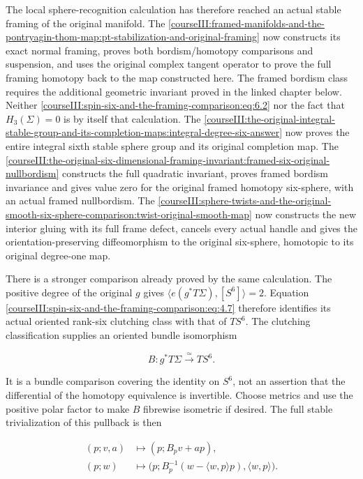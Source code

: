 The local sphere-recognition calculation has therefore reached an actual stable framing of the original manifold. The \cref{courseIII:framed-manifolds-and-the-pontryagin-thom-map:pt-stabilization-and-original-framing} now constructs its exact normal framing, proves both bordism/homotopy comparisons and suspension, and uses the original complex tangent operator to prove the full framing homotopy back to the map constructed here. The framed bordism class requires the additional geometric invariant proved in the linked chapter below. Neither \eqref{courseIII:spin-six-and-the-framing-comparison:eq:6.2} nor the fact that \(H_3(\Sigma)=0\) is by itself that calculation. The \cref{courseIII:the-original-integral-stable-group-and-its-completion-maps:integral-degree-six-answer} now proves the entire integral sixth stable sphere group and its original completion map. The \cref{courseIII:the-original-six-dimensional-framing-invariant:framed-six-original-nullbordism} constructs the full quadratic invariant, proves framed bordism invariance and gives value zero for the original framed homotopy six-sphere, with an actual framed nullbordism. The \cref{courseIII:sphere-twists-and-the-original-smooth-six-sphere-comparison:twist-original-smooth-map} now constructs the new interior gluing with its full frame defect, cancels every actual handle and gives the orientation-preserving diffeomorphism to the original six-sphere, homotopic to its original degree-one map.

There is a stronger comparison already proved by the same calculation. The positive degree of the original \(g\) gives \(\langle e(g^*T\Sigma),[S^6]\rangle=2\). Equation \eqref{courseIII:spin-six-and-the-framing-comparison:eq:4.7} therefore identifies its actual oriented rank-six clutching class with that of \(TS^6\). The clutching classification supplies an oriented bundle isomorphism

\begin{equation}
B:g^*T\Sigma\xrightarrow{\ \simeq\ }TS^6.
\label{courseIII:spin-six-and-the-framing-comparison:eq:6.3}
\end{equation}

It is a bundle comparison covering the identity on \(S^6\), not an assertion that the differential of the homotopy equivalence is invertible. Choose metrics and use the positive polar factor to make \(B\) fibrewise isometric if desired. The full stable trivialization of this pullback is then

\begin{equation}
\begin{aligned}
(p;v,a)&\longmapsto(p;B_pv+ap),\\
(p;w)&\longmapsto
\bigl(p;B_p^{-1}(w-\langle w,p\rangle p),\langle w,p\rangle\bigr).
\end{aligned}
\label{courseIII:spin-six-and-the-framing-comparison:eq:6.4}
\end{equation}

